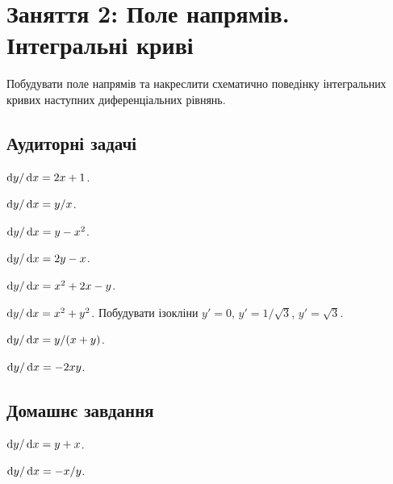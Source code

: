 \section*{Заняття 2: Поле напрямів. Інтегральні криві}

Побудувати поле напрямів та накреслити схематично поведінку інтегральних кривих наступних диференціальних рівнянь.

\subsection*{Аудиторні задачі}

\begin{problem}
	$\mathop{}\!\mathrm{d} y / \mathop{}\!\mathrm{d} x = 2 x + 1$.
\end{problem}

\begin{problem}
	$\mathop{}\!\mathrm{d} y / \mathop{}\!\mathrm{d} x = y / x$.
\end{problem}

\begin{problem}
	$\mathop{}\!\mathrm{d} y / \mathop{}\!\mathrm{d} x = y - x^2$.
\end{problem}

\begin{problem}
	$\mathop{}\!\mathrm{d} y / \mathop{}\!\mathrm{d} x = 2 y - x$.
\end{problem}

\begin{problem}
	$\mathop{}\!\mathrm{d} y / \mathop{}\!\mathrm{d} x = x^2 + 2 x - y$.
\end{problem}

\begin{problem}
	$\mathop{}\!\mathrm{d} y / \mathop{}\!\mathrm{d} x = x^2 + y^2$. Побудувати ізокліни $y' = 0$, $y' = 1 / \sqrt{3}$, $y' = \sqrt{3}$.
\end{problem}

\begin{problem}
	$\mathop{}\!\mathrm{d} y / \mathop{}\!\mathrm{d} x = y / (x + y)$.
\end{problem}

\begin{problem}
	$\mathop{}\!\mathrm{d} y / \mathop{}\!\mathrm{d} x = - 2 x y$.
\end{problem}

\subsection*{Домашнє завдання}

\begin{problem}
	$\mathop{}\!\mathrm{d} y / \mathop{}\!\mathrm{d} x = y + x$.
\end{problem}

\begin{problem}
	$\mathop{}\!\mathrm{d} y / \mathop{}\!\mathrm{d} x = - x / y$.
\end{problem}

